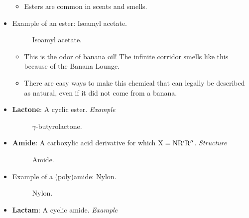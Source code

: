\documentclass[../notes.tex]{subfiles}
\begin{document}
\begin{itemize}
    \begin{itemize}
        \item Esters are common in scents and smells.
    \end{itemize}
    \item Example of an ester: Isoamyl acetate.
    \begin{figure}[h!]
        \centering
        \footnotesize
        \caption{Isoamyl acetate.}
        \label{fig:isoamylAcetate}
    \end{figure}
    \begin{itemize}
        \item This is the odor of banana oil! The infinite corridor smells like this because of the Banana Lounge.
        \item There are easy ways to make this chemical that can legally be described as natural, even if it did not come from a banana.
    \end{itemize}
    \pagebreak
    \item \textbf{Lactone}: A cyclic ester. \emph{Example}
    \begin{figure}[h!]
        \centering
        \footnotesize
        \caption{$\gamma$-butyrolactone.}
        \label{fig:carbLactone}
    \end{figure}
    \item \textbf{Amide}: A carboxylic acid derivative for which $\ce{X}=\ce{NR$'$R$''$}$. \emph{Structure}
    \begin{figure}[h!]
        \centering
        \footnotesize
        \caption{Amide.}
        \label{fig:carbAmide}
    \end{figure}
    \item Example of a (poly)amide: Nylon.
    \begin{figure}[h!]
        \centering
        \footnotesize
        \caption{Nylon.}
        \label{fig:nylon}
    \end{figure}
    \item \textbf{Lactam}: A cyclic amide. \emph{Example}
    \begin{figure}[h!]
        \centering
        \footnotesize

\end{figure}
\end{itemize}
\end{document}

